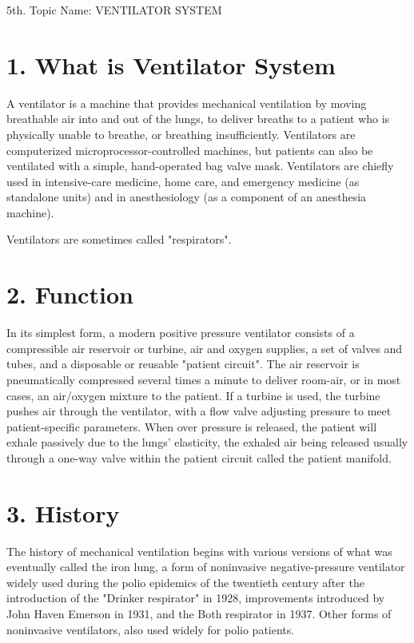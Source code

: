 \documentclass[12pt]{article}
\begin{document}
\maketitle
\clearpage
5th. Topic Name: VENTILATOR SYSTEM

\section*{1.   What is Ventilator System}
A ventilator is a machine that provides mechanical ventilation by moving breathable air into and out of the lungs, to deliver breaths to a patient who is physically unable to breathe, or breathing insufficiently. Ventilators are computerized microprocessor-controlled machines, but patients can also be ventilated with a simple, hand-operated bag valve mask. Ventilators are chiefly used in intensive-care medicine, home care, and emergency medicine (as standalone units) and in anesthesiology (as a component of an anesthesia machine).

Ventilators are sometimes called "respirators".

\section*{2.  Function }
In its simplest form, a modern positive pressure ventilator consists of a compressible air reservoir or turbine, air and oxygen supplies, a set of valves and tubes, and a disposable or reusable "patient circuit". The air reservoir is pneumatically compressed several times a minute to deliver room-air, or in most cases, an air/oxygen mixture to the patient. If a turbine is used, the turbine pushes air through the ventilator, with a flow valve adjusting pressure to meet patient-specific parameters. When over pressure is released, the patient will exhale passively due to the lungs' elasticity, the exhaled air being released usually through a one-way valve within the patient circuit called the patient manifold.

\section{3.   History  }
The history of mechanical ventilation begins with various versions of what was eventually called the iron lung, a form of noninvasive negative-pressure ventilator widely used during the polio epidemics of the twentieth century after the introduction of the "Drinker respirator" in 1928, improvements introduced by John Haven Emerson in 1931, and the Both respirator in 1937. Other forms of noninvasive ventilators, also used widely for polio patients.
\end{document}
